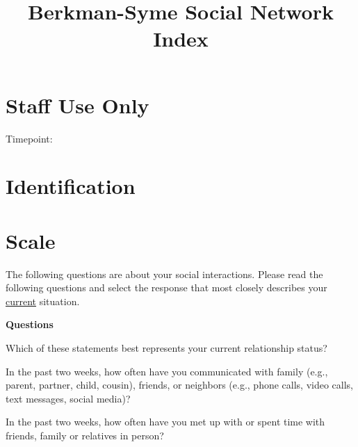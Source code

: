 \documentclass[
  english,
  a4paper,
  sdaps_style=qr,
  checkmode= check
]{sdapsclassic}
\title{Berkman-Syme Social Network Index}
\author{}
\date{}
\begin{document}
\begin{questionnaire}[noinfo]

\section{Staff Use Only}
    \begin{optionquestion}[cols=3, var=timepoint]{Timepoint:}
    \end{optionquestion}

\section{Identification}

\section{Scale}
The following questions are about your social interactions. Please read the following questions and select the response that most closely describes your \underline{current} situation.

\textbf{Questions}
\begin{optionquestion}[cols=2, singlechoice, var=bs01]{Which of these statements best represents your current relationship status?}
\end{optionquestion}

\begin{optionquestion}[cols=2, singlechoice, var=bs02]{In the past two weeks, how often have you communicated with family (e.g., parent, partner, child, cousin), friends, or neighbors (e.g., phone calls, video calls, text messages, social media)?}
\end{optionquestion}

\begin{optionquestion}[cols=2, singlechoice, var=bs03]{In the past two weeks, how often have you met up with or spent time with friends, family or relatives in person?}
\end{optionquestion}


\end{questionnaire}
\end{document}
